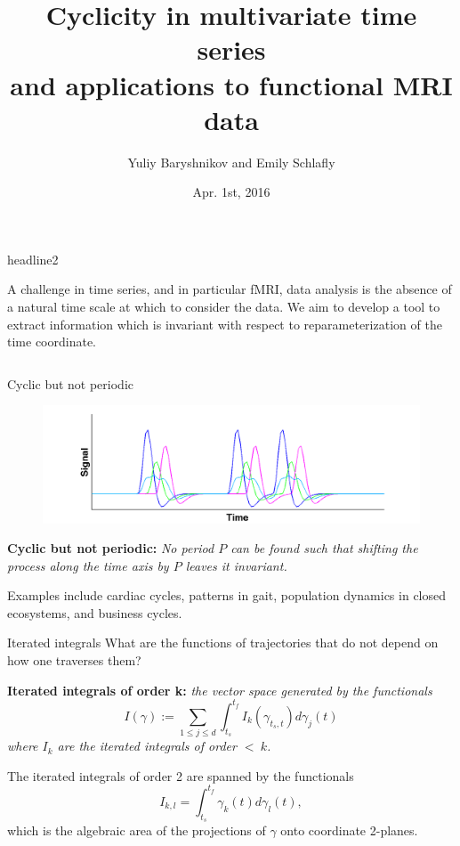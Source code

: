 \documentclass[final,hyperref={pdfpagelabels=false}]{beamer}
\title[Fancy Posters]{Cyclicity in multivariate time series \\[10pt]\large{and applications to functional MRI data}}
\author[Baryshnikov \& Schlafly]{Yuliy Baryshnikov and Emily Schlafly}
\institute[University of Illinois]{Department of Mathematics, University of Illinois Urbana-Champaign}
\date{Apr. 1st, 2016}
\begin{document}
\begin{beamercolorbox}[wd=\paperwidth]{headline2}
\begin{center}
\large
A challenge in time series, and in particular fMRI, data analysis is the absence of a natural time scale at which to consider the data. We aim to develop a tool to extract information which is invariant with respect to reparameterization of the time coordinate.
\end{center}
\end{beamercolorbox}
\begin{columns}[t]
  \begin{column}{.26\textwidth}
    \begin{block}{Cyclic but not periodic}
	    \begin{figure}
		    \includegraphics[trim=130 0 100 0, clip, width=.8\textwidth]{pictures/poster/model_bold.png}
	    \end{figure}
	    \textbf{Cyclic but not periodic:} \textit{No period $P$ can be found such that shifting the process along the time axis by $P$ leaves it invariant.} \par
	    Examples include cardiac cycles, patterns in gait, population dynamics in closed ecosystems, and business cycles.
    \end{block}
    \vfill
    \begin{block}{Iterated integrals}
    	What are the functions of trajectories that do not depend on how one traverses them? \par
    	\textbf{Iterated integrals of order k:} \textit{the vector space generated by the functionals}
    	$$I(\gamma) := \sum_{1\leq j \leq d}\int_{t_s}^{t_f}I_k(\gamma_{t_s, t})d\gamma_j(t)$$
    	\textit{where $I_k$ are the iterated integrals of order $< \ k$.}\par
    	The iterated integrals of order 2 are spanned by the functionals
    	$$I_{k,l} = \int_{t_s}^{t_f}\gamma_k(t)d\gamma_l(t),$$
    	which is the algebraic area of the projections of $\gamma$ onto coordinate 2-planes.
    	\begin{figure}

\end{figure}
\end{block}
\end{column}
\end{columns}
\end{document}
